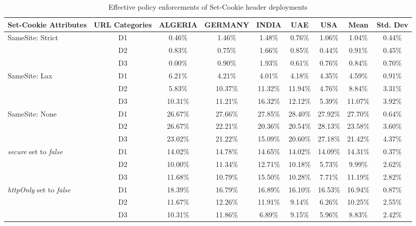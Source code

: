 \begin{table}[!ht]
    \centering
    \footnotesize
    \caption{Effective policy enforcements of Set-Cookie header deployments}
    \label{tab:sec-lot-cookie}
    \begin{tabular}{l|c|c|c|c|c|c|c|c}
    \toprule
        Set-Cookie Attributes & URL Categories & ALGERIA & GERMANY & INDIA & UAE & USA & Mean & Std. Dev \\ \midrule
        \multirow{3}{*}{SameSite: Strict} & D1 & 0.46\% & 1.46\% & 1.48\% & 0.76\% & 1.06\% & 1.04\% & 0.44\% \\
        ~ & D2 & 0.83\% & 0.75\% & 1.66\% & 0.85\% & 0.44\% & 0.91\% & 0.45\% \\
        ~ & D3 & 0.00\% & 0.90\% & 1.93\% & 0.61\% & 0.76\% & 0.84\% & 0.70\% \\ \hline
        \multirow{3}{*}{SameSite: Lax} & D1 & 6.21\% & 4.21\% & 4.01\% & 4.18\% & 4.35\% & 4.59\% & 0.91\% \\
        ~ & D2 & 5.83\% & 10.37\% & 11.32\% & 11.94\% & 4.76\% & 8.84\% & 3.31\% \\
        ~ & D3 & 10.31\% & 11.21\% & 16.32\% & 12.12\% & 5.39\% & 11.07\% & 3.92\% \\ \hline
        \multirow{3}{*}{SameSite: None} & D1 & 26.67\% & 27.66\% & 27.85\% & 28.40\% & 27.92\% & 27.70\% & 0.64\% \\
        ~ & D2 & 26.67\% & 22.21\% & 20.36\% & 20.54\% & 28.13\% & 23.58\% & 3.60\% \\
        ~ & D3 & 23.02\% & 21.22\% & 15.09\% & 20.60\% & 27.18\% & 21.42\% & 4.37\% \\ \hline
        \multirow{3}{*}{{\textit{secure} set to \textit{false}}} & D1 & 14.02\% & 14.78\% & 14.65\% & 14.02\% & 14.09\% & 14.31\% & 0.37\% \\
        ~ & D2 & 10.00\% & 11.34\% & 12.71\% & 10.18\% & 5.73\% & 9.99\% & 2.62\% \\
        ~ & D3 & 11.68\% & 10.79\% & 15.50\% & 10.28\% & 7.71\% & 11.19\% & 2.82\% \\ \hline
        \multirow{3}{*}{\textit{httpOnly} set to \textit{false}} & D1 & 18.39\% & 16.79\% & 16.89\% & 16.10\% & 16.53\% & 16.94\% & 0.87\% \\
        ~ & D2 & 11.67\% & 12.26\% & 11.91\% & 9.14\% & 6.26\% & 10.25\% & 2.55\% \\
        ~ & D3 & 10.31\% & 11.86\% & 6.89\% & 9.15\% & 5.96\% & 8.83\% & 2.42\% \\ \bottomrule
    \end{tabular}
\end{table}
